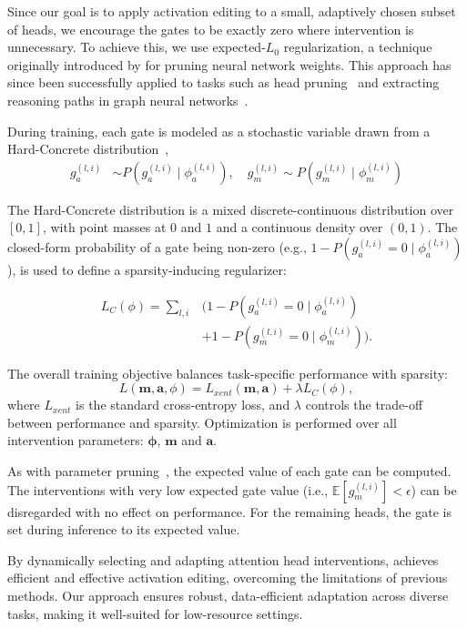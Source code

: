 Since our goal is to apply activation editing to a small, adaptively chosen subset of heads, we encourage the gates to be exactly zero where intervention is unnecessary. To achieve this, we use expected-$L_0$ regularization, a technique originally introduced by \citet{louizos2018learning} for pruning neural network weights. This approach has since been successfully applied to tasks such as head pruning~\cite{voita-etal-2019-analyzing} and extracting reasoning paths in graph neural networks~\cite{schlichtkrull2020interpreting}.

During training, each gate is modeled as a stochastic variable drawn from a Hard-Concrete distribution~\cite{louizos2018learning},
\begin{align}
g_{a}^{(l,i)} &\sim P(g_{a}^{(l,i)} \mid \phi_a^{(l,i)}), \quad
g_{m}^{(l,i)} \sim P(g_{m}^{(l,i)} \mid \phi_m^{(l,i)}) \end{align}

The Hard-Concrete distribution is a mixed discrete-continuous distribution over 
$[0, 1]$, with point masses at $0$ and $1$ and a continuous density over $(0, 1)$. The closed-form probability of a gate being non-zero (e.g., $1 - P(g_{a}^{(l,i)} = 0 \mid \phi_a^{(l,i)})$), is used to define a sparsity-inducing regularizer:

\begin{align}
L_C(\phi) = \sum_{l,i} & \Big( 1 - P(g_{a}^{(l,i)} = 0 \mid \phi_a^{(l,i)}) \\ & + 1 - P(g_{m}^{(l,i)} = 0 \mid \phi_m^{(l,i)}) \Big).
\end{align}

The overall training objective balances task-specific performance with sparsity:  
\begin{equation}  
    L(\mathbf{m}, \mathbf{a}, \phi) = L_{xent}(\mathbf{m}, \mathbf{a}) + \lambda L_C(\phi),  
\end{equation}  
where $L_{xent}$ is the standard cross-entropy loss, and $\lambda$ controls the trade-off between performance and sparsity. Optimization is performed over all intervention parameters: $\mathbf{\phi}$, $\mathbf{m}$ and $\mathbf{a}$.

As with parameter pruning~\cite{louizos2018learning}, the expected value of each gate can be computed. The interventions with very low expected gate value (i.e., $\mathbb{E}[g_m^{(l,i)}] < \epsilon$) can be 
disregarded with no effect on \jola{} performance. For the remaining heads, the gate is set during inference to its expected value.

By dynamically selecting and adapting attention head interventions, \jola{} achieves efficient and effective activation editing, overcoming the limitations of previous methods.
Our approach ensures robust, data-efficient adaptation across diverse tasks, making it well-suited for low-resource settings.
